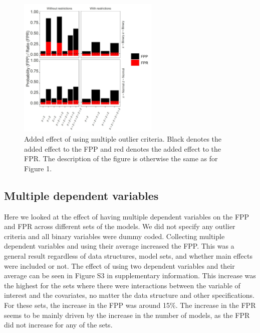 \begin{figure}[hbt!]
\includegraphics[width=0.6\textwidth]{R/Analysis/Result/Figures/Figure1B.jpeg}
\centering
\caption{Added effect of using multiple outlier criteria. Black denotes the added effect to the FPP and red denotes the added effect to the FPR.  The description of the figure is otherwise the same as for Figure 1.}
\label{fig:mainfigure}
\end{figure}

\subsection{Multiple dependent variables}
Here we looked at the effect of having multiple dependent variables on the FPP and FPR across different sets of the models. We did not specify any outlier criteria and all binary variables were dummy coded. Collecting multiple dependent variables and using their average increased the FPP. This was a general result regardless of data structures, model sets, and whether main effects were included or not. The effect of using two dependent variables and their average can be seen in Figure S3 in supplementary information. This increase was the highest for the sets where there were interactions between the variable of interest and the covariates, no matter the data structure and other specifications. For these sets, the increase in the FPP was around 15\%. The increase in the FPR seems to be mainly driven by the increase in the number of models, as the FPR did not increase for any of the sets. 

